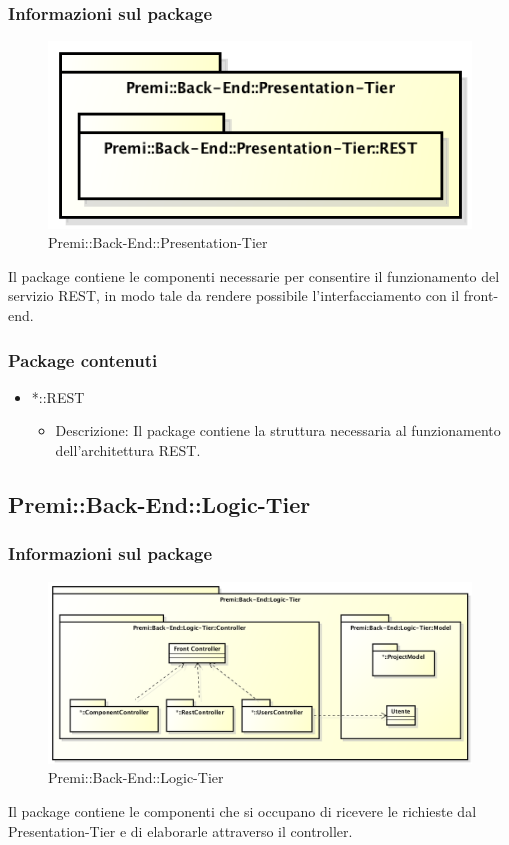 	\subsubsection{Informazioni sul package}
		\begin{figure}[h]
			\centering
			\includegraphics[width=0.7\linewidth]{img/back-end-package_presentation-tier}
			\caption[Premi::Back-End::Presentation-Tier]{Premi::Back-End::Presentation-Tier}
		\end{figure}
		Il package contiene le componenti necessarie per consentire il funzionamento del servizio REST, in modo tale da rendere possibile l'interfacciamento con il front-end.
		
	\subsubsection{Package contenuti}
		\begin{itemize}
			\item *::REST
			\begin{itemize}
				\item Descrizione: Il package contiene la struttura necessaria al funzionamento dell'architettura REST.
			\end{itemize}
		\end{itemize}
		
		
\subsection{Premi::Back-End::Logic-Tier}
	\subsubsection{Informazioni sul package}
	\begin{figure}[h]
		\centering
		\includegraphics[width=0.7\linewidth]{img/back-end-package_logic-tier}
		\caption[Premi::Back-End::Logic-Tier]{Premi::Back-End::Logic-Tier}
	\end{figure}
	Il package contiene le componenti che si occupano di ricevere le richieste dal Presentation-Tier e di elaborarle attraverso il controller.
	
